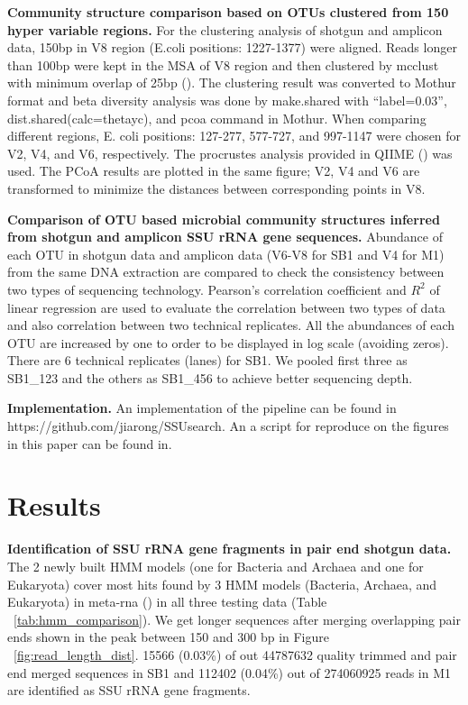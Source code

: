 \documentclass[12pt]{article}
\begin{document}
  {\bf Community structure comparison based on OTUs clustered from 150 hyper variable regions. }
  For the clustering analysis of shotgun and amplicon data, 150bp in V8 region (E.coli positions: 1227-1377) were aligned. Reads longer than 100bp were kept in the MSA of V8 region and then clustered by mcclust with minimum overlap of 25bp (\cite{rdp2009}). The clustering result was converted to Mothur format and beta diversity analysis was done by make.shared with ``label=0.03'', dist.shared(calc=thetayc), and pcoa command in Mothur. When comparing different regions, E. coli positions: 127-277, 577-727, and 997-1147 were chosen for V2, V4, and V6, respectively. The procrustes analysis provided in QIIME (\cite{qiime}) was used. The PCoA results are plotted in the same figure; V2, V4 and V6 are transformed to minimize the distances between corresponding points in V8.

  {\bf Comparison of OTU based microbial community structures inferred from shotgun and amplicon SSU rRNA gene sequences. }
Abundance of each OTU in shotgun data and amplicon data (V6-V8 for SB1 and V4 for M1) from the same DNA extraction are compared to check the consistency between two types of sequencing technology. Pearson’s correlation coefficient and $R^2$ of linear regression are used to evaluate the correlation between two types of data and also correlation between two technical replicates. All the abundances of each OTU are increased by one to order to be displayed in log scale (avoiding zeros). There are 6 technical replicates (lanes) for SB1. We pooled first three as SB1\_123 and the others as SB1\_456 to achieve better sequencing depth.

  {\bf Implementation. }
An implementation of the pipeline can be found in https://github.com/jiarong/SSUsearch. An a script for reproduce on the figures in this paper can be found in.

\section{Results}

  {\bf Identification of SSU rRNA gene fragments in pair end shotgun data. }
  The 2 newly built HMM models (one for Bacteria and Archaea and one for Eukaryota) cover most hits found by 3 HMM models (Bacteria, Archaea, and Eukaryota) in meta-rna (\cite{metarna}) in all three testing data (Table ~\ref{tab:hmm_comparison}). We get longer sequences after merging overlapping pair ends shown in the peak between 150 and 300 bp in Figure ~\ref{fig:read_length_dist}. 15566 (0.03\%) of out 44787632 quality trimmed and pair end merged sequences in SB1 and 112402 (0.04\%) out of 274060925 reads in M1 are identified as SSU rRNA gene fragments. 
\end{document}

